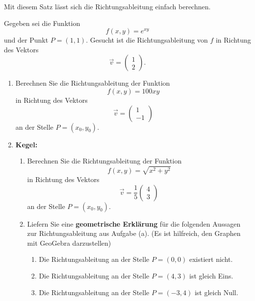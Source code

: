 Mit diesem Satz lässt sich die Richtungsableitung einfach berechnen.

\begin{bsp}
	{}{}
	Gegeben sei die Funktion
	\[
		f(x, y) = e^{xy}
	\]
	und der Punkt \( P = (1, 1) \). Gesucht ist die Richtungsableitung von \( f \) in Richtung des Vektors
	\[
		\vec{v} = \begin{pmatrix} 1 \\ 2 \end{pmatrix}.
	\]
	\vspace*{5cm}
\end{bsp}

\begin{ueb}
	{}{}


	\begin{enumerate}
		\item Berechnen Sie die Richtungsableitung der Funktion
		      \[
			      f(x, y) = 100xy
		      \]
		      in Richtung des Vektors
		      \[
			      \vec{v} = \begin{pmatrix} 1 \\ -1 \end{pmatrix}
		      \]
		      an der Stelle \( P = (x_0, y_0) \).

		\item \textbf{Kegel:}
		      \begin{enumerate}
			      \item

			            Berechnen Sie die Richtungsableitung der Funktion
			            \[
				            f(x, y) = \sqrt{x^2 + y^2}
			            \]
			            in Richtung des Vektors
			            \[
				            \vec{v} = \frac{1}{5} \begin{pmatrix} 4 \\ 3 \end{pmatrix}
			            \]
			            an der Stelle \( P = (x_0, y_0) \).



			      \item Liefern Sie eine \textbf{geometrische Erklärung} für die folgenden Aussagen zur Richtungsableitung aus Aufgabe (a).
			            (Es ist hilfreich, den Graphen mit GeoGebra darzustellen)

			            \begin{enumerate}
				            \item Die Richtungsableitung an der Stelle \( P = (0, 0) \) existiert nicht.
				            \item Die Richtungsableitung an der Stelle \( P = (4, 3) \) ist gleich Eins.
				            \item Die Richtungsableitung an der Stelle \( P = (-3, 4) \) ist gleich Null.
			            \end{enumerate}
		      \end{enumerate}
	\end{enumerate}

\end{ueb}

